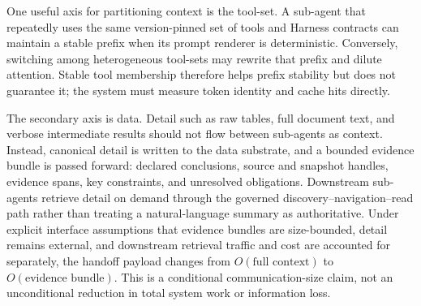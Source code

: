 One useful axis for partitioning context is the tool-set. A sub-agent that repeatedly uses the same version-pinned set of tools and Harness contracts can maintain a stable prefix when its prompt renderer is deterministic. Conversely, switching among heterogeneous tool-sets may rewrite that prefix and dilute attention. Stable tool membership therefore helps prefix stability but does not guarantee it; the system must measure token identity and cache hits directly.

The secondary axis is data. Detail such as raw tables, full document text, and verbose intermediate results should not flow between sub-agents as context. Instead, canonical detail is written to the data substrate, and a bounded evidence bundle is passed forward: declared conclusions, source and snapshot handles, evidence spans, key constraints, and unresolved obligations. Downstream sub-agents retrieve detail on demand through the governed discovery--navigation--read path rather than treating a natural-language summary as authoritative. Under explicit interface assumptions that evidence bundles are size-bounded, detail remains external, and downstream retrieval traffic and cost are accounted for separately, the handoff payload changes from $O(\text{full context})$ to $O(\text{evidence bundle})$. This is a conditional communication-size claim, not an unconditional reduction in total system work or information loss.

